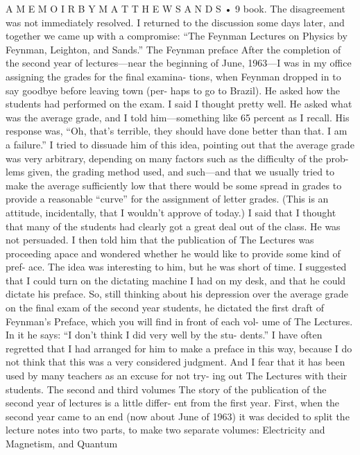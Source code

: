 \documentclass[10pt,oneside]{article}
\begin{document}
A  M E M O I R  B Y  M A T T H E W  S A N D S • 9 book. The disagreement was not immediately resolved. I returned to the discussion some days later, and together we came up with a compromise: “The Feynman Lectures on Physics by Feynman, Leighton, and Sands.” The Feynman preface After the completion of the second year of lectures---near the beginning of June, 1963---I was in my office assigning the grades for the final examina- tions, when Feynman dropped in to say goodbye before leaving town (per- haps to go to Brazil). He asked how the students had performed on the exam. I said I thought pretty well. He asked what was the average grade, and I told him---something like 65 percent as I recall. His response was, “Oh, that’s terrible, they should have done better than that. I am a failure.” I tried to dissuade him of this idea, pointing out that the average grade was very arbitrary, depending on many factors such as the difficulty of the prob- lems given, the grading method used, and such---and that we usually tried to make the average sufficiently low that there would be some spread in grades to provide a reasonable “curve” for the assignment of letter grades. (This is an attitude, incidentally, that I wouldn’t approve of today.) I said that I thought that many of the students had clearly got a great deal out of the class. He was not persuaded. I then told him that the publication of The Lectures was proceeding apace and wondered whether he would like to provide some kind of pref- ace. The idea was interesting to him, but he was short of time. I suggested that I could turn on the dictating machine I had on my desk, and that he could dictate his preface. So, still thinking about his depression over the average grade on the final exam of the second year students, he dictated the first draft of Feynman’s Preface, which you will find in front of each vol- ume of The Lectures. In it he says: “I don’t think I did very well by the stu- dents.” I have often regretted that I had arranged for him to make a preface in this way, because I do not think that this was a very considered judgment. And I fear that it has been used by many teachers as an excuse for not try- ing out The Lectures with their students. The second and third volumes The story of the publication of the second year of lectures is a little differ- ent from the first year. First, when the second year came to an end (now about June of 1963) it was decided to split the lecture notes into two parts, to make two separate volumes: Electricity and Magnetism, and Quantum\par
\end{document}
